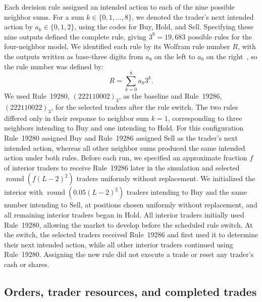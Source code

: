 Each decision rule assigned an intended action to each of the
nine possible neighbor sums. For a sum $k\in\{0,1,\ldots,8\}$, we
denoted the trader's next intended action by $a_k\in\{0,1,2\}$, using
the codes for Buy, Hold, and Sell. Specifying these nine outputs defined
the complete rule, giving $3^9=19{,}683$ possible rules for the
four-neighbor model. We identified each rule by its Wolfram rule number
$R$, with the outputs written as base-three digits from $a_8$ on the
left to $a_0$ on the
right~\cite{wolfram1984universality,packard1985two}, so the rule number
was defined by:
\begin{equation}
  R=\sum_{k=0}^{8}a_k3^k.
  \label{eq:rule-index}
\end{equation}
We used Rule~19280, $(222110002)_3$, as the baseline and Rule~19286,
$(222110022)_3$, for the selected traders after the rule switch. The two
rules differed only in their response to neighbor sum $k=1$,
corresponding to three neighbors intending to Buy and one intending to
Hold. For this configuration Rule~19280 assigned Buy and Rule~19286
assigned Sell as the trader's next intended action, whereas all other
neighbor sums produced the same intended action under both rules. Before
each run, we specified an approximate fraction $f$ of interior traders
to receive Rule~19286 later in the simulation and selected
$\operatorname{round}(f(L-2)^2)$ traders uniformly without replacement.
We initialized the interior with $\operatorname{round}(0.05(L-2)^2)$
traders intending to Buy and the same number intending to Sell, at
positions chosen uniformly without replacement, and all remaining
interior traders began in Hold. All interior traders initially used
Rule~19280, allowing the market to develop before the scheduled rule
switch. At the switch, the selected traders received Rule~19286 and
first used it to determine their next intended action, while all other
interior traders continued using Rule~19280. Assigning the new rule did
not execute a trade or reset any trader's cash or shares.

\subsection{Orders, trader resources, and completed trades}

